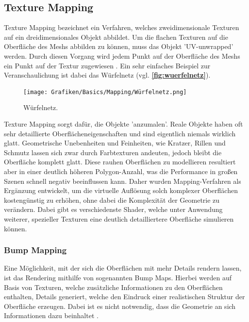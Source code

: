 \subsection{Texture Mapping}

Texture Mapping bezeichnet ein Verfahren, welches zweidimensionale Texturen auf ein dreidimensionales Objekt
abbildet. Um die flachen Texturen auf die Oberfläche des Meshs abbilden zu können, muss das Objekt 'UV-unwrapped' werden.
Durch diesen Vorgang wird jedem Punkt auf der Oberfläche des Meshs ein Punkt auf der Textur zugewiesen \parencite{Catmull1974} \parencite{Blinn1976}.
Ein sehr einfaches Beispiel zur Veranschaulichung ist dabei das Würfelnetz (vgl. \textbf{\autoref{fig:wuerfelnetz}}).
\begin{figure}[!h]
	\centering
	\texttt{[image: Grafiken/Basics/Mapping/Würfelnetz.png]}
	\begin{footnotesize}
		\caption{Würfelnetz.}
		\label{fig:wuerfelnetz}
	\end{footnotesize}
\end{figure}

Texture Mapping sorgt dafür, die Objekte 'anzumalen'.
Reale Objekte haben oft sehr detaillierte Oberflächeneigenschaften und sind eigentlich niemals wirklich glatt.
Geometrische Unebenheiten und Feinheiten, wie Kratzer, Rillen und Schmutz lassen sich zwar durch 
Farbtexturen andeuten, jedoch bleibt die Oberfläche komplett glatt. Diese rauhen Oberflächen zu modellieren resultiert
aber in einer deutlich höheren Polygon-Anzahl, was die Performance in großen Szenen schnell negativ beeinflussen kann.
Daher wurden Mapping-Verfahren als Ergänzung entwickelt, um die virtuelle Auflösung
solch komplexer Oberflächen kostengünstig zu erhöhen, ohne dabei die Komplexität der Geometrie zu verändern.
Dabei gibt es verschiedenste Shader, welche unter Anwendung weiterer, spezieller Texturen eine deutlich detailliertere
Oberfläche simulieren können.


\subsubsection{Bump Mapping}

Eine Möglichkeit, mit der sich die Oberflächen mit mehr Details rendern lassen, ist das Rendering
mithilfe von sogenannten Bump Maps.
Hierbei werden auf Basis von Texturen, welche zusätzliche Informationen zu den Oberflächen enthalten,
Details generiert, welche den Eindruck einer realistischen Struktur der Oberfläche erzeugen.
Dabei ist es nicht notwendig, dass die Geometrie an sich Informationen dazu beinhaltet \parencite{Blinn1978}.

